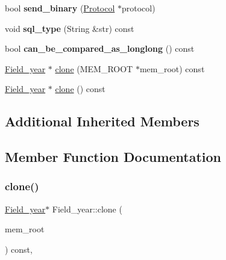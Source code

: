 \begin{DoxyCompactItemize}
\item 
\mbox{\label{classField__year_a9d1b326a32ecca98df86e69d24095e5d}} 
bool {\bfseries send\+\_\+binary} (\mbox{\hyperlink{classProtocol}{Protocol}} $\ast$protocol)
\item 
\mbox{\label{classField__year_a5a3c4a72f358dcf0e9a075b9a2ca49e4}} 
void {\bfseries sql\+\_\+type} (String \&str) const
\item 
\mbox{\label{classField__year_aecc3c5ed51d96f53794f4994d159a39f}} 
bool {\bfseries can\+\_\+be\+\_\+compared\+\_\+as\+\_\+longlong} () const
\item 
\mbox{\hyperlink{classField__year}{Field\+\_\+year}} $\ast$ \mbox{\hyperlink{classField__year_a14b179ace36d418dd8e3fc714fef9a41}{clone}} (M\+E\+M\+\_\+\+R\+O\+OT $\ast$mem\+\_\+root) const
\item 
\mbox{\hyperlink{classField__year}{Field\+\_\+year}} $\ast$ \mbox{\hyperlink{classField__year_a6c270a994f22f6c4979091d31a453942}{clone}} () const
\end{DoxyCompactItemize}
\subsection*{Additional Inherited Members}


\subsection{Member Function Documentation}
\mbox{\label{classField__year_a14b179ace36d418dd8e3fc714fef9a41}} 
\subsubsection{\texorpdfstring{clone()}{clone()}\hspace{0.1cm}{\footnotesize\ttfamily [1/2]}}
{\footnotesize\ttfamily \mbox{\hyperlink{classField__year}{Field\+\_\+year}}$\ast$ Field\+\_\+year\+::clone (\begin{DoxyParamCaption}\item[{M\+E\+M\+\_\+\+R\+O\+OT $\ast$}]{mem\+\_\+root }\end{DoxyParamCaption}) const\hspace{0.3cm}{\ttfamily [inline]}, {\ttfamily [virtual]}}


